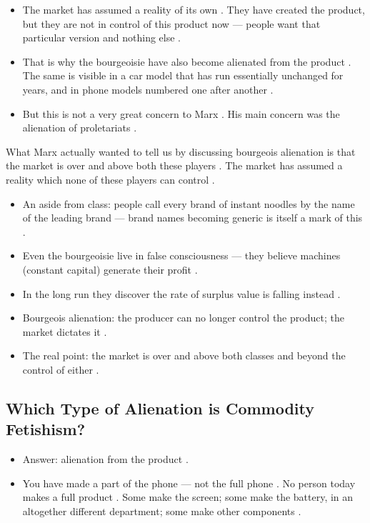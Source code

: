 \begin{itemize}
    \item The market has assumed a reality of its own . They have created the product, but they are not in control of this product now --- people want that particular version and nothing else .
    \item That is why the bourgeoisie have also become alienated from the product . The same is visible in a car model that has run essentially unchanged for years, and in phone models numbered one after another .
    \item But this is not a very great concern to Marx . His main concern was the alienation of proletariats .
\end{itemize}

\begin{KeyConcept}
What Marx actually wanted to tell us by discussing bourgeois alienation is that the market is over and above both these players . The market has assumed a reality which none of these players can control .
\begin{itemize}
    \item An aside from class: people call every brand of instant noodles by the name of the leading brand --- brand names becoming generic is itself a mark of this .
\end{itemize}
\end{KeyConcept}

\begin{QuickRevision}
\begin{itemize}
    \item Even the bourgeoisie live in false consciousness --- they believe machines (constant capital) generate their profit .
    \item In the long run they discover the rate of surplus value is falling instead .
    \item Bourgeois alienation: the producer can no longer control the product; the market dictates it .
    \item The real point: the market is over and above both classes and beyond the control of either .
\end{itemize}
\end{QuickRevision}

\subsection{Which Type of Alienation is Commodity Fetishism?}
\begin{itemize}
    \item Answer: alienation from the product .
    \item You have made a part of the phone --- not the full phone . No person today makes a full product . Some make the screen; some make the battery, in an altogether different department; some make other components .
\end{itemize}

